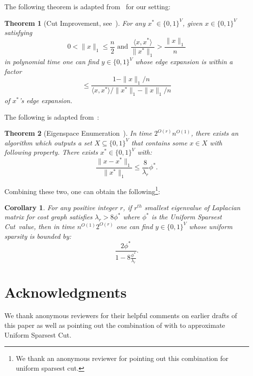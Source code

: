 \documentclass{article}
\newtheorem{theorem}{Theorem}[section]
\newtheorem{corollary}{Corollary}[section]
\newcommand{\usc}{\textsc{\sf Uniform Sparsest Cut}}
\newcounter{alg-count}
\def\ngap{}
\renewcommand{\usc}{{\sc Uniform Sparsest Cut}}
\newcommand{\vnote}[1]{}
\newcommand{\aknote}[1]{}
\begin{document}
\def\uscopt{\phi^\ast} The following theorem is adapted
from~\cite{al08} for our setting:
\begin{theorem}[Cut Improvement, see~\cite{al08}]
  For any $x^\ast\in \{0,1\}^{V}$, given $x \in \{0,1\}^{V}$
  satisfying
\[0<{\|x\|_1}{} \le \frac{n}{2} \text{ and }
\frac{\langle x, x^\ast\rangle}{\|x^\ast\|_1} > \frac{ \|x\|_1}{n}
\] 
in polynomial time one can find $y\in \{0,1\}^{V}$ whose edge
expansion is within a factor \[
\le \frac{ 1 - \|x\|_1/n }{ \langle x, x^\ast\rangle/\|x^\ast\|_1 -
  \|x\|_1/n }\] of $x^\ast$'s edge expansion.
\end{theorem}
\vnote{What happened to the proof you wrote for this?}  \aknote{I only
  had proof of corollary, which is commented out. Do you want to put
  it back?}  The following is adapted from~\cite{ABS}:
\begin{theorem}[Eigenspace Enumeration~\cite{ABS}]
  In time $2^{O(r)} n^{O(1)}$, there exists an algorithm which outputs
  a set $X\subseteq \{0,1\}^{V}$ that contains some $x\in X$ with
  following property.  There exists $x^\ast\in \{0,1\}^{V}$ with:
\[
\frac{\|x - x^\ast\|_1}{ \|x^\ast\|_1 } \le \frac{8}{\lambda_r}
\phi^\ast. \]
\end{theorem}
Combining these two, one can obtain the following\footnote{We thank an
  anonymous reviewer for pointing out this combination for uniform
  sparsest cut.}:
\begin{corollary} For any positive integer $r$, if $r^{th}$ smallest eigenvalue of
  Laplacian matrix for cost graph satisfies $\lambda_r > 8 \phi^\ast$
  where $\phi^\ast$ is the \usc\ value, then in time $n^{O(1)}
  2^{O(r)}$ one can find $y\in \{0,1\}^{V}$ whose uniform sparsity is
  bounded by:
  \[
  \frac{2 \phi^\ast}{ 1 - 8 \frac{\phi^\ast}{\lambda_r}}.
  \]
\end{corollary}
\iffalse
\begin{proof}
  Let $x^\ast$ be a uniform sparsest cut with sparsity $\phi$ having
  $\|x^\ast\|_1 \le \frac{n}{2}$.  Then we can find a vector
  $x\in\{0,1\}^{V}$ using eigenspace enumeration such that:
  \[
  \frac{\|x^\ast - x\|_1}{\|x^\ast\|_1} \le \delta,
  \] where $\delta =\frac{8 {x^\ast}^T L_C x^\ast}{\lambda_r
    {x^\ast}^T L_K x^\ast }$.

  Similarly, complement of $x$, $1-x$, satisfies:
  \[
  \frac{\|(1-x^\ast) -(1-x)\|_1}{\|1-x^\ast\|_1} = \frac{\|x^\ast -
    x\|_1}{n-\|x^\ast\|_1} \le \frac{\|x^\ast - x\|_1}{\|x^\ast\|_1}
  \le \delta.
  \]
  Therefore
  \[ \frac{ \langle x, x^\ast\rangle }{\|x^\ast\|_1}, \frac{ \langle
    1-x, 1-x^\ast\rangle }{\|1-x^\ast\|_1} \ge 1 - \delta .
  \] We apply cut improvement algorithm to $x$ if $\|x\|_1 \le
  \frac{n}{2}$, and to $1-x$ otherwise.  Without loss of generality,
  let's assume $\|x\|_1 \le \frac{n}{2}$. Then cut improvement finds
  $y$ such that:
  \[ \Phi_y(G)\le \phi_y(G) \le \frac{\phi_{x^\ast}(G) }{1-\delta} \le
  \frac{2 \Phi^\ast}{1-\delta}.
  \] Substituting the expression for $\delta$ completes the proof.
\end{proof}
\fi \ngap
\section*{Acknowledgments}
We thank anonymous reviewers for their helpful comments on earlier
drafts of this paper as well as pointing out the combination of
\cite{al08} with \cite{ABS} to approximate \usc.


\end{document}
